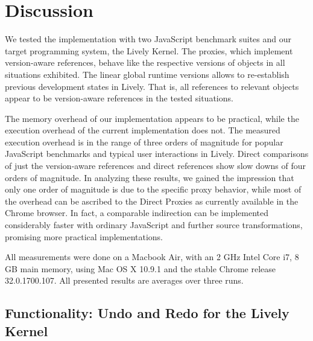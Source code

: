 \chapter{Discussion} \label{chapter:DISCUSSION}

We tested the implementation with two JavaScript benchmark suites and our target programming system, the Lively Kernel.
The proxies, which implement version-aware references, behave like the respective versions of objects in all situations exhibited.
The linear global runtime versions allows to re-establish previous development states in Lively.
That is, all references to relevant objects appear to be version-aware references in the tested situations.

The memory overhead of our implementation appears to be practical, while the execution overhead of the current implementation does not.
The measured execution overhead is in the range of three orders of magnitude for popular JavaScript benchmarks and typical user interactions in Lively.
Direct comparisons of just the version-aware references and direct references show slow downs of four orders of magnitude.
In analyzing these results, we gained the impression that only one order of magnitude is due to the specific proxy behavior, while most of the overhead can be ascribed to the Direct Proxies as currently available in the Chrome browser.
In fact, a comparable indirection can be implemented considerably faster with ordinary JavaScript and further source transformations, promising more practical implementations.

All measurements were done on a Macbook Air, with an 2 GHz Intel Core i7, 8 GB main memory, using Mac OS X 10.9.1 and the stable Chrome release 32.0.1700.107.
All presented results are averages over three runs.

\section{Functionality: Undo and Redo for the Lively Kernel}


